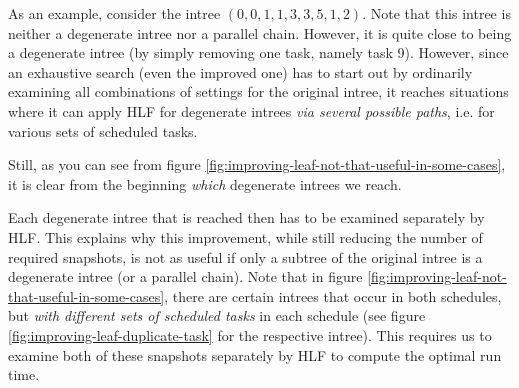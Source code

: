 As an example, consider the intree $(0,0,1,1,3,3,5,1,2)$. Note that this intree is neither a degenerate intree nor a parallel chain. However, it is quite close to being a degenerate intree (by simply removing one task, namely task 9). However, since an exhaustive search (even the improved one) has to start out by ordinarily examining all combinations of settings for the original intree, it reaches situations where it can apply HLF for degenerate intrees \emph{via several possible paths}, i.e. for various sets of scheduled tasks.

Still, as you can see from figure \ref{fig:improving-leaf-not-that-useful-in-some-cases}, it is clear from the beginning \emph{which} degenerate intrees we reach. 

Each degenerate intree that is reached then has to be examined separately by HLF. This explains why this improvement, while still reducing the number of required snapshots, is not as useful if only a subtree of the original intree is a degenerate intree (or a parallel chain). Note that in figure \ref{fig:improving-leaf-not-that-useful-in-some-cases}, there are certain intrees  that occur in both schedules, but \emph{with different sets of scheduled tasks} in each schedule (see figure \ref{fig:improving-leaf-duplicate-task} for the respective intree). This requires us to examine both of these snapshots separately by HLF to compute the optimal run time.

